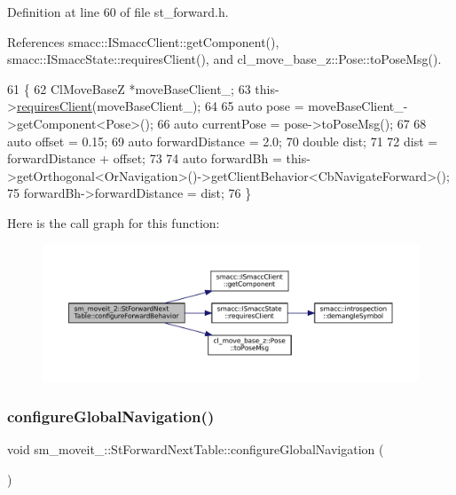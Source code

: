 Definition at line 60 of file st\+\_\+forward.\+h.



References smacc\+::\+I\+Smacc\+Client\+::get\+Component(), smacc\+::\+I\+Smacc\+State\+::requires\+Client(), and cl\+\_\+move\+\_\+base\+\_\+z\+::\+Pose\+::to\+Pose\+Msg().


\begin{DoxyCode}
61   \{
62     ClMoveBaseZ *moveBaseClient\_;
63     this->\hyperlink{classsmacc_1_1ISmaccState_a7f95c9f0a6ea2d6f18d1aec0519de4ac}{requiresClient}(moveBaseClient\_);
64 
65     \textcolor{keyword}{auto} pose = moveBaseClient\_->getComponent<Pose>();
66     \textcolor{keyword}{auto} currentPose = pose->toPoseMsg();
67 
68     \textcolor{keyword}{auto} offset = 0.15;
69     \textcolor{keyword}{auto} forwardDistance = 2.0;
70     \textcolor{keywordtype}{double} dist;
71     
72     dist = forwardDistance + offset;
73 
74     \textcolor{keyword}{auto} forwardBh = this->getOrthogonal<OrNavigation>()->getClientBehavior<CbNavigateForward>();
75     forwardBh->forwardDistance = dist;
76   \}
\end{DoxyCode}
Here is the call graph for this function\+:
\nopagebreak
\begin{figure}[H]
\begin{center}
\leavevmode
\includegraphics[width=350pt]{structsm__moveit__2_1_1StForwardNextTable_ac2775e5e49737d3877e249e0354a5f08_cgraph}
\end{center}
\end{figure}
\mbox{\label{structsm__moveit__2_1_1StForwardNextTable_a79b062960dd4f3b75464f3e47b87d79c}} 
\subsubsection{\texorpdfstring{configure\+Global\+Navigation()}{configureGlobalNavigation()}}
{\footnotesize\ttfamily void sm\+\_\+moveit\+\_\+::\+St\+Forward\+Next\+Table\+::configure\+Global\+Navigation (\begin{DoxyParamCaption}{ }\end{DoxyParamCaption})\hspace{0.3cm}{\ttfamily [inline]}}



